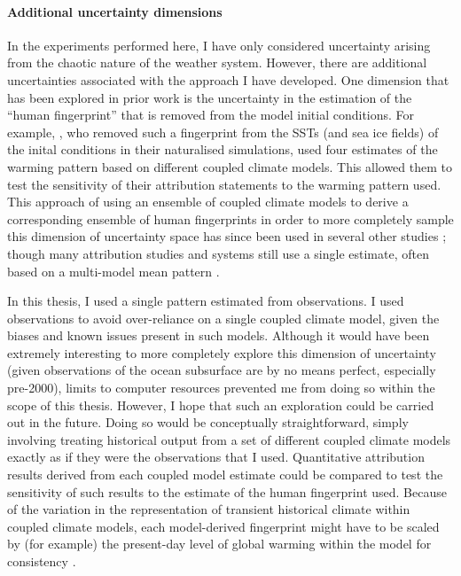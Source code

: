   \paragraph*{Additional uncertainty dimensions}

    In the experiments performed here, I have only considered uncertainty arising from the chaotic nature of the weather system. However, there are additional uncertainties associated with the approach I have developed. One dimension that has been explored in prior work is the uncertainty in the estimation of the ``human fingerprint'' that is removed from the model initial conditions. For example, \citet{pall_anthropogenic_2011}, who removed such a fingerprint from the SSTs (and sea ice fields) of the inital conditions in their naturalised simulations, used four estimates of the warming pattern based on different coupled climate models. This allowed them to test the sensitivity of their attribution statements to the warming pattern used. This approach of using an ensemble of coupled climate models to derive a corresponding ensemble of human fingerprints in order to more completely sample this dimension of uncertainty space has since been used in several other studies \citep{schaller_human_2016}; though many attribution studies and systems still use a single estimate, often based on a multi-model mean pattern \citep{ciavarella_upgrade_2018,stone_benchmark_2021}. 

    In this thesis, I used a single pattern estimated from observations. I used observations to avoid over-reliance on a single coupled climate model, given the biases and known issues present in such models. Although it would have been extremely interesting to more completely explore this dimension of uncertainty (given observations of the ocean subsurface are by no means perfect, especially pre-2000), limits to computer resources prevented me from doing so within the scope of this thesis. However, I hope that such an exploration could be carried out in the future. Doing so would be conceptually straightforward, simply involving treating historical output from a set of different coupled climate models exactly as if they were the observations that I used. Quantitative attribution results derived from each coupled model estimate could be compared to test the sensitivity of such results to the estimate of the human fingerprint used. Because of the variation in the representation of transient historical climate within coupled climate models, each model-derived fingerprint might have to be scaled by (for example) the present-day level of global warming within the model for consistency \citep{tokarska_past_2020}.


